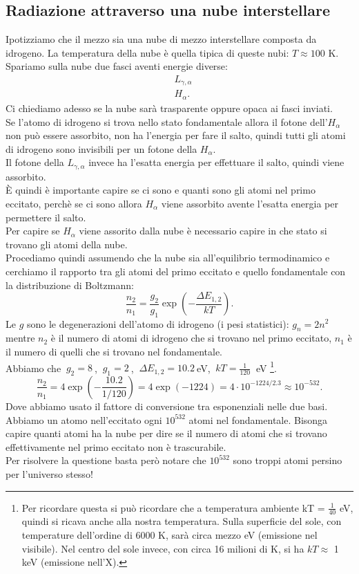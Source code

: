 \subsection{Radiazione attraverso una nube interstellare}%
Ipotizziamo che il mezzo sia una nube di mezzo interstellare composta da idrogeno. La temperatura della nube è quella tipica di queste nubi: $T \approx 100$ K. Spariamo sulla nube due fasci aventi energie diverse:
\begin{align*}
	&L_{\gamma,\alpha} \\
	&H_{\alpha}
.\end{align*}
Ci chiediamo adesso se la nube sarà trasparente oppure opaca ai fasci inviati.\\
Se l'atomo di idrogeno si trova nello stato fondamentale allora il fotone dell'$H_{\alpha}$ non può essere assorbito, non ha l'energia per fare il salto, quindi tutti gli atomi di idrogeno sono invisibili per un fotone della $H_{\alpha}$. \\
Il fotone della $L_{\gamma,\alpha}$ invece ha l'esatta energia per effettuare il salto, quindi viene assorbito. \\
È quindi è importante capire se ci sono e quanti sono gli atomi nel primo eccitato, perchè se ci sono allora $H_{\alpha}$ viene assorbito avente l'esatta energia per permettere il salto. \\
Per capire se $H_{\alpha }$ viene assorito dalla nube è necessario capire in che stato si trovano gli atomi della nube.\\
Procediamo quindi assumendo che la nube sia all'equilibrio termodinamico e cerchiamo il rapporto tra gli atomi del primo eccitato e quello fondamentale con la distribuzione di Boltzmann:
\[
	\frac{n_2}{n_1} = \frac{g_2}{g_1}\exp\left( -\frac{\Delta E_{1,2}}{kT} \right) 
.\] 
Le $g$ sono le degenerazioni dell'atomo di idrogeno (i pesi statistici): $g_{n}= 2 n^2$ mentre $n_2$ è il numero di atomi di idrogeno che si trovano nel primo eccitato, $n_1$ è il numero di quelli che si trovano nel fondamentale. \\
Abbiamo che $ \ g_2 = 8 \ $, $ \ g_1 = 2 \ $,  $ \ \Delta E _{1,2}= 10.2 \ $eV, $ \ kT =\frac{1}{120} \ $ eV \footnote{Per ricordare questa si può ricordare che a temperatura ambiente kT = $\frac{1}{40}$ eV, quindi si ricava anche alla nostra temperatura. Sulla superficie del sole, con temperature dell'ordine di 6000 K, sarà circa mezzo eV (emissione nel visibile). Nel centro del sole invece, con circa 16 milioni di K, si ha $kT \approx$ 1 keV (emissione nell'X).}.\\
\[
	\frac{n_2}{n_1} = 4 \exp\left( - \frac{10.2}{1 / 120} \right)  = 4 \exp\left( -1224 \right) = 4\cdot 10^{-1224 /2.3} \approx 10^{-532}
.\] 
Dove abbiamo usato il fattore di conversione tra esponenziali nelle due basi.\\
Abbiamo un atomo nell'eccitato ogni $10^{532}$ atomi nel fondamentale. Bisonga capire quanti atomi ha la nube per dire se il numero di atomi che si trovano effettivamente nel primo eccitato non è trascurabile. \\
Per risolvere la questione basta però notare che $10^{532}$ sono troppi atomi persino per l'universo stesso!
